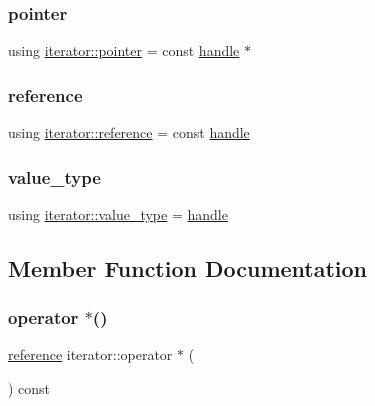 \mbox{\label{classiterator_a47f6aa746357c82353203dfcbe8d8c1c}} 
\subsubsection{\texorpdfstring{pointer}{pointer}}
{\footnotesize\ttfamily using \mbox{\hyperlink{classiterator_a47f6aa746357c82353203dfcbe8d8c1c}{iterator\+::pointer}} =  const \mbox{\hyperlink{classhandle}{handle}} $\ast$}

\mbox{\label{classiterator_af05a87057b5891fb984648429ca60492}} 
\subsubsection{\texorpdfstring{reference}{reference}}
{\footnotesize\ttfamily using \mbox{\hyperlink{classiterator_af05a87057b5891fb984648429ca60492}{iterator\+::reference}} =  const \mbox{\hyperlink{classhandle}{handle}}}

\mbox{\label{classiterator_abe68ba19a8452dd80cf2c893c1feb9d6}} 
\subsubsection{\texorpdfstring{value\_type}{value\_type}}
{\footnotesize\ttfamily using \mbox{\hyperlink{classiterator_abe68ba19a8452dd80cf2c893c1feb9d6}{iterator\+::value\+\_\+type}} =  \mbox{\hyperlink{classhandle}{handle}}}



\subsection{Member Function Documentation}
\mbox{\label{classiterator_a1a895cbe29c76f26c410dbbfe3565425}} 
\subsubsection{\texorpdfstring{operator $\ast$()}{operator *()}}
{\footnotesize\ttfamily \mbox{\hyperlink{classiterator_af05a87057b5891fb984648429ca60492}{reference}} iterator\+::operator $\ast$ (\begin{DoxyParamCaption}{ }\end{DoxyParamCaption}) const\hspace{0.3cm}{\ttfamily [inline]}}

